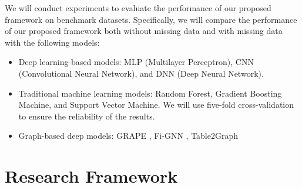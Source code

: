 We will conduct experiments to evaluate the performance of our proposed framework on benchmark datasets. Specifically, we will compare the performance of our proposed framework both without missing data and with missing data with the following models:
\begin{itemize}
	\item Deep learning-based models: MLP (Multilayer Perceptron), CNN (Convolutional Neural Network), and DNN (Deep Neural Network).
	\item Traditional machine learning models: Random Forest, Gradient Boosting Machine, and Support Vector Machine.
	We will use five-fold cross-validation to ensure the reliability of the results.
	\item Graph-based deep models: GRAPE \cite{GRAPE}, Fi-GNN \cite{FiGNN}, Table2Graph \cite{Table2Graph}
\end{itemize}

\section{Research Framework}
